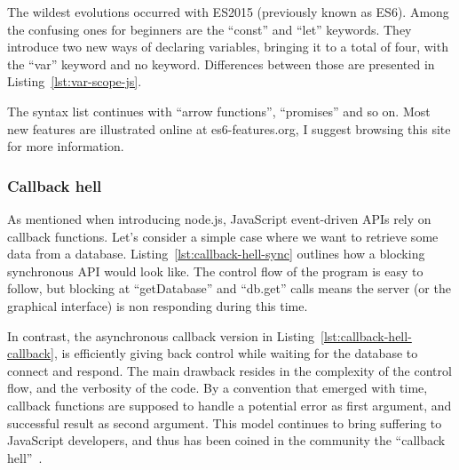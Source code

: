 
The wildest evolutions occurred with ES2015 (previously known as ES6).
Among the confusing ones for beginners are the ``const'' and ``let'' keywords.
They introduce two new ways of declaring variables, bringing it to a total of four,
with the ``var'' keyword and no keyword.
Differences between those are presented in Listing~\ref{lst:var-scope-js}.



The syntax list continues with ``arrow functions'', ``promises'' and so on.
Most new features are illustrated online at es6-features.org,
I suggest browsing this site for more information.


\subsubsection{Callback hell}%
\label{ssub:callback_hell}

As mentioned when introducing node.js,
JavaScript event-driven APIs rely on callback functions.
Let's consider a simple case where we want to retrieve some data
from a database.
Listing~\ref{lst:callback-hell-sync} outlines how a blocking synchronous API
would look like.
The control flow of the program is easy to follow,
but blocking at ``getDatabase'' and ``db.get'' calls
means the server (or the graphical interface) is non responding
during this time.



In contrast, the asynchronous callback version
in Listing~\ref{lst:callback-hell-callback},
is efficiently giving back control while waiting for the
database to connect and respond.
The main drawback resides in the complexity of the control flow,
and the verbosity of the code.
By a convention that emerged with time,
callback functions are supposed to handle a potential error
as first argument, and successful result as second argument.
This model continues to bring suffering to JavaScript developers,
and thus has been coined in the community the ``callback hell''~\cite{callback-hell}.

